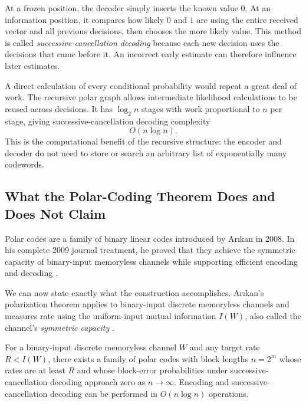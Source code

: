 At a frozen position, the decoder simply inserts the known value $0$. At an information position, it compares how likely $0$ and $1$ are using the entire received vector and all previous decisions, then chooses the more likely value. This method is called \emph{successive-cancellation decoding} because each new decision uses the decisions that came before it. An incorrect early estimate can therefore influence later estimates.

A direct calculation of every conditional probability would repeat a great deal of work. The recursive polar graph allows intermediate likelihood calculations to be reused across decisions. It has $\log_2n$ stages with work proportional to $n$ per stage, giving successive-cancellation decoding complexity
\begin{equation}
O(n\log n).
\label{eq:successive-cancellation-complexity}
\end{equation}
This is the computational benefit of the recursive structure: the encoder and decoder do not need to store or search an arbitrary list of exponentially many codewords.

\subsection{What the Polar-Coding Theorem Does and Does Not Claim}
\label{subsec:polar-theorem}

Polar codes are a family of binary linear codes introduced by Arıkan in 2008. In his complete 2009 journal treatment, he proved that they achieve the symmetric capacity of binary-input memoryless channels while supporting efficient encoding and decoding \cite{Arikan2009}.

We can now state exactly what the construction accomplishes. Arıkan's polarization theorem applies to binary-input discrete memoryless channels and measures rate using the uniform-input mutual information $I(W)$, also called the channel's \emph{symmetric capacity} \cite{Arikan2009}.

\begin{smjtheorem}
For a binary-input discrete memoryless channel $W$ and any target rate $R<I(W)$, there exists a family of polar codes with block lengths $n=2^m$ whose rates are at least $R$ and whose block-error probabilities under successive-cancellation decoding approach zero as $n\to\infty$. Encoding and successive-cancellation decoding can be performed in $O(n\log n)$ operations.
\label{thm:polar-coding-simplified}
\end{smjtheorem}

